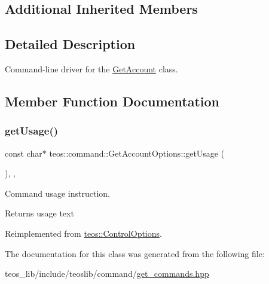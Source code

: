 \subsection*{Additional Inherited Members}


\subsection{Detailed Description}
Command-\/line driver for the \mbox{\hyperlink{classteos_1_1command_1_1_get_account}{Get\+Account}} class. 

\subsection{Member Function Documentation}
\mbox{\label{classteos_1_1command_1_1_get_account_options_a987381bcf3f687b7babfe197edf0dc26}} 
\subsubsection{\texorpdfstring{get\+Usage()}{getUsage()}}
{\footnotesize\ttfamily const char$\ast$ teos\+::command\+::\+Get\+Account\+Options\+::get\+Usage (\begin{DoxyParamCaption}{ }\end{DoxyParamCaption})\hspace{0.3cm}{\ttfamily [inline]}, {\ttfamily [protected]}, {\ttfamily [virtual]}}



Command \textquotesingle{}usage\textquotesingle{} instruction. 

\begin{DoxyReturn}{Returns}
usage text 
\end{DoxyReturn}


Reimplemented from \mbox{\hyperlink{classteos_1_1_control_options_a0aa5671f9bc750ed5280c26c543874f3}{teos\+::\+Control\+Options}}.



The documentation for this class was generated from the following file\+:\begin{DoxyCompactItemize}
\item 
teos\+\_\+lib/include/teoslib/command/\mbox{\hyperlink{get__commands_8hpp}{get\+\_\+commands.\+hpp}}\end{DoxyCompactItemize}
